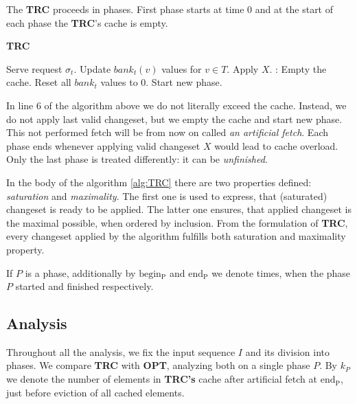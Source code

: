 The \textbf{TRC} proceeds in phases. First phase starts at time 0 and at the 
start of each phase the \textbf{TRC}'s cache is empty. 
\begin{algorithm}
\caption{\textbf{TRC}}
\label{alg:TRC}
\begin{algorithmic}[1]
  \State Serve request $\sigma_t$.
  \State Update $bank_t(v)$ values for $v \in T$.
 \State Apply $X$.
 :
  \State Empty the cache.
  \State Reset all $bank_t$ values to 0.
  \State Start new phase.
 \EndIf
 \EndIf
\EndFor
  \end{algorithmic}
\end{algorithm}

In line 6 of the algorithm above we do not literally exceed the cache. Instead, 
we do not apply last valid changeset, but we empty the cache and start new 
phase. This not performed fetch will be from now on called \textit{an artificial fetch}.
Each phase ends whenever applying valid changeset $X$ would lead to cache 
overload. Only the last phase is treated differently: it can be \textit{unfinished}. 

In the body of the algorithm \ref{alg:TRC} there are two properties defined: 
\textit{saturation} and \textit{maximality}. The first one is used to express, 
that (saturated) changeset is ready to be applied. The latter one ensures, that
applied changeset is the maximal possible, when ordered by inclusion. From the 
formulation of \textbf{TRC}, every changeset applied by the algorithm fulfills
both saturation and maximality property.

If $P$ is a phase, additionally by $\mathrm{begin_P}$ and $\mathrm{end_P}$ we 
denote times, when the phase $P$ started and finished respectively.

\subsection{Analysis}
Throughout all the analysis, we fix the input sequence $I$ and its division into 
phases. We compare \textbf{TRC} with \textbf{OPT}, analyzing both on a single 
phase $P$. By $k_P$ we denote the number of elements in \textbf{TRC's} cache 
after artificial fetch at $\mathrm{end_P}$, just before eviction of all cached 
elements.

